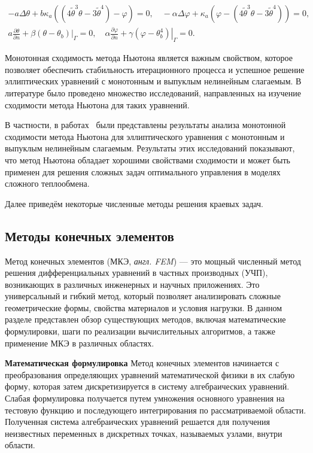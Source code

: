 \[
    \begin{gathered}
        -a \Delta \theta+b \kappa_{a}\left(\left(4 \widetilde{\theta}^{3}
        \theta-3 \widetilde{\theta}^{4}\right)-\varphi\right)=0,
        \quad-\alpha \Delta \varphi
        +\kappa_{a}\left(\varphi
        -\left(4 \widetilde{\theta}^{3}
        \theta-3 \widetilde{\theta}^{4}\right)\right)=0, \\
        a \frac{\partial \theta}{\partial n}
        +\left.\beta\left(\theta-\theta_{b}\right)\right|_{\Gamma}=0,
        \quad \alpha \frac{\partial \varphi}{\partial n}
        +\left.\gamma\left(\varphi-\theta_{b}^{4}\right)\right|_{\Gamma}=0.
    \end{gathered}
\]

Монотонная сходимость метода Ньютона является важным свойством,
которое позволяет обеспечить стабильность итерационного процесса
и успешное решение эллиптических уравнений
с монотонным и выпуклым нелинейным слагаемым.
В литературе было проведено множество исследований, направленных
на изучение сходимости метода Ньютона для таких уравнений.

В частности, в работах~\cite{Mukhamadiev1971, Schryer1971} были представлены
результаты анализа монотонной сходимости метода Ньютона для эллиптического
уравнения с монотонным и выпуклым нелинейным слагаемым.
Результаты этих исследований показывают, что метод Ньютона обладает
хорошими свойствами сходимости и может быть применен для решения
сложных задач оптимального управления в моделях сложного теплообмена.

Далее приведём некоторые численные методы решения краевых задач.

\subsection{Методы конечных элементов}
\label{subsec:ch4/sec1/fem}

Метод конечных элементов (МКЭ, \textit{англ. FEM}) — это мощный численный метод решения
дифференциальных уравнений в частных производных (УЧП), возникающих
в различных инженерных и научных приложениях.
Это универсальный и гибкий метод, который позволяет анализировать
сложные геометрические формы, свойства материалов и условия нагрузки.
В данном разделе представлен обзор существующих методов, включая математические
формулировки, шаги по реализации вычислительных алгоритмов,
а также применение МКЭ в различных областях.

\textbf{Математическая формулировка}
Метод конечных элементов начинается с преобразования определяющих
уравнений математической физики в их слабую форму, которая затем дискретизируется
в систему алгебраических уравнений.
Слабая формулировка получается путем умножения основного уравнения
на тестовую функцию и последующего интегрирования по рассматриваемой области.
Полученная система алгебраических уравнений решается для получения
неизвестных переменных в дискретных точках,
называемых узлами, внутри области.


